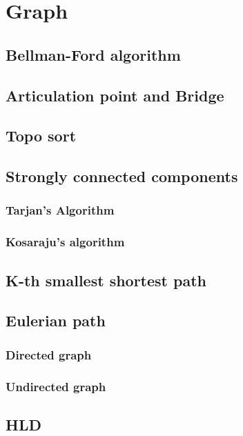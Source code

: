 \section{Graph}

\subsection{Bellman-Ford algorithm}

\subsection{Articulation point and Bridge}

\subsection{Topo sort}

\subsection{Strongly connected components}
  \subsubsection{Tarjan's Algorithm}
  \subsubsection{Kosaraju's algorithm}

\subsection{K-th smallest shortest path}

\subsection{Eulerian path}
  \subsubsection{Directed graph}

  \subsubsection{Undirected graph}

\subsection{HLD}
